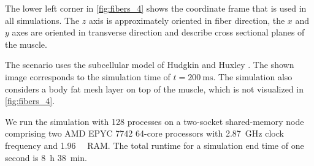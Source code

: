 The lower left corner in \cref{fig:fibers_4} shows the coordinate frame that is used in all simulations. The $z$ axis is approximately  oriented in fiber direction, the $x$ and $y$ axes are oriented in transverse direction and describe cross sectional planes of the muscle.

The scenario uses the subcellular model of Hudgkin and Huxley \cite{Hodgkin1952}. The shown image corresponds to the simulation time of $t=\SI{200}{\milli\second}$. The simulation also considers a body fat mesh layer on top of the muscle, which is not visualized in \cref{fig:fibers_4}.

We run the simulation with 128 processes on a two-socket shared-memory node comprising two AMD EPYC 7742 64-core processors with \SI{2.87}{\giga\hertz} clock frequency and \SI{1.96}{\tebi\byte} RAM. The total runtime for a simulation end time of one second is \SI{8}{\hour} \SI{38}{\minute}.

